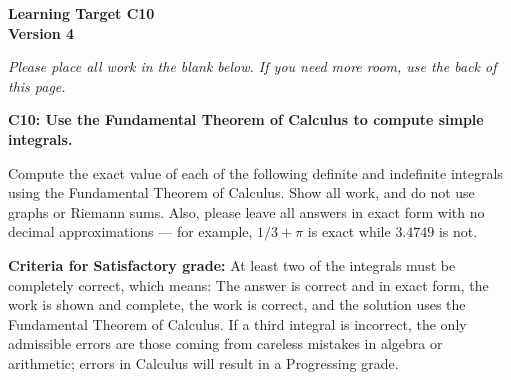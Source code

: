 \documentclass[10pt]{article}
\begin{document}
	\vspace*{0in}

		\begin{center}
			\textbf{Learning Target C10 \\
			Version 4} \\
		\end{center}

\emph{Please place all work in the blank below. If you need more room, use the back of this page.}

\begin{framed}
	\textbf{\textbf{C10:} Use the Fundamental Theorem of Calculus to compute simple integrals.}
\end{framed}

Compute the exact value of each of the following definite and indefinite integrals using the Fundamental Theorem of Calculus. Show all work, and do not use graphs or Riemann sums. Also, please leave all answers in exact form with no decimal approximations --- for example, $1/3 + \pi$ is exact while $3.4749$ is not. 


\begin{enumerate}
    \item $\displaystyle{\int_1^2 (x^2 + x^{1/4}) \, dx}$
    \item $\displaystyle{\int_0^{\pi} \sin(t) \, dt$
    \item $\displaystyle{\int_0^1 (\sqrt{x} - x^2) \, dx}$
\end{enumerate}

\vfill


\begin{small}
    \begin{framed}
        	\textbf{Criteria for Satisfactory grade:} At least two of the integrals must be completely correct, which means: The answer is correct and in exact form, the work is shown and complete, the work is correct, and the solution uses the Fundamental Theorem of Calculus. If a third integral is incorrect, the only admissible errors are those coming from careless mistakes in algebra or arithmetic; errors in Calculus will result in a Progressing grade. 
    \end{framed}

\end{small}
\end{document}
